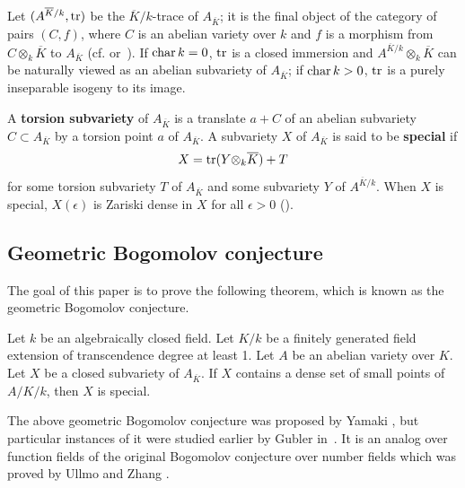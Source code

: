 Let $(A^{\overline{K}/k}, {\rm tr})$ be the $\overline{K}/k$-trace of  $A_{\overline{K}}$; it
is the final object of the category of pairs $(C,f)$, where $C$ is an abelian variety over $ k$ and $f$ is
a morphism from $C\otimes_{ k}\overline{K}$ to  $A_{\overline{K}}$ (cf. \cite[$\mathsection$7]{Lang:AbelianBook} or~\cite[$\mathsection$6]{Conrad}).
If ${\rm char\,} k=0$, ${\rm tr}$ is a closed immersion and $A^{\overline{K}/ k}\otimes_{k}\overline{K}$ can be naturally viewed
as an abelian subvariety of $A_{\overline{K}}$;
if ${\rm char\,} k>0$, ${\rm tr}$ is a purely inseparable isogeny to its image.

A {\bf{torsion subvariety}} of $A_{\overline K}$ is a translate $a+C$ of an abelian
subvariety $C\subset A_{\overline K}$ by a torsion point $a$ of $A_{\overline K}$. A subvariety $X$ of $A_{\overline{K}}$ is said to be {\bf{special}} if
\begin{equation}
X={\rm tr}(Y{\otimes_{k}\overline{K}})+T
\end{equation}
for some torsion subvariety $T$ of $A_{\overline{K}}$ and  some subvariety $Y$ of $A^{\overline{K}/k}$.
When $X$ is special,  $X(\epsilon)$ is Zariski dense in $X$ for all $\epsilon >0$ (\cite[Theorem 5.4, Chapter 6]{Lang1983}).



\subsection{Geometric Bogomolov conjecture}

The goal of this paper is to prove the following theorem, which is known as the geometric Bogomolov conjecture.

\begin{thm}
\notready \label{thmmain}
Let $k$ be an algebraically closed field.
Let $K/k$ be a finitely generated field extension of transcendence degree at least 1.
Let $A$ be an abelian variety over $K$.
Let $X$ be a closed subvariety of $A_{\overline{K}}$.
If $X$ contains a dense set of small points of $A/K/k$, then $X$ is special.
\end{thm}

The above geometric Bogomolov conjecture was proposed by Yamaki \cite[Conjecture 0.3]{Yamaki2013}, but particular
 instances of it were studied earlier by Gubler in~\cite{Gubler2007}. It is an analog over function fields of the original Bogomolov conjecture over number fields which was proved by Ullmo \cite{Ullmo1998} and Zhang \cite{Zhang1998}.

